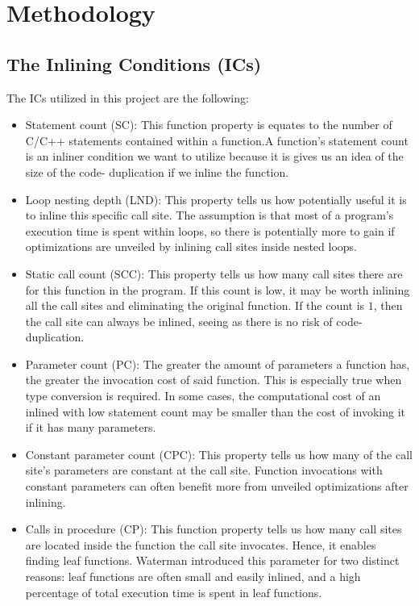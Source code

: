 
\clearpage
\section{Methodology}
\label{sec:methodology}


\subsection{The Inlining Conditions (ICs)}
\label{sub:meth:inlining_conditions}

The ICs utilized in this project are the following:

\begin{itemize}

	\item Statement count (SC): This function property is equates to the number
of C/C++ statements contained within a function.A function's statement count is
an inliner condition we want to utilize because it is gives us an idea of the
size of the code- duplication if we inline the function.

	\item Loop nesting depth (LND): This property tells us how potentially
useful it is to inline this specific call site. The assumption is that most of a
program's execution time is spent within loops, so there is potentially more to
gain if optimizations are unveiled by inlining call sites inside nested loops.

	\item Static call count (SCC): This property tells us how many call sites
there are for this function in the program. If this count is low, it may be
worth inlining all the call sites and eliminating the original function. If the
count is $1$, then the call site can always be inlined, seeing as there is no
risk of code-duplication.

	\item Parameter count (PC): The greater the amount of parameters a function
has, the greater the invocation cost of said function. This is especially true
when type conversion is required. In some cases, the computational cost of an
inlined with low statement count may be smaller than the cost of invoking it if
it has many parameters\cite{AdaptvCompilAndInlingWaterman}.

	\item Constant parameter count (CPC): This property tells us how many of the
call site's parameters are constant at the call site. Function invocations with
constant parameters can often benefit more from unveiled optimizations after
inlining.

	\item Calls in procedure (CP): This function property tells us how many call
sites are located inside the function the call site invocates. Hence, it enables
finding leaf functions. Waterman\cite{AdaptvCompilAndInlingWaterman} introduced
this parameter for two distinct reasons: leaf functions are often small and
easily inlined, and a high percentage of total execution time is spent in leaf
functions.

\end{itemize}
